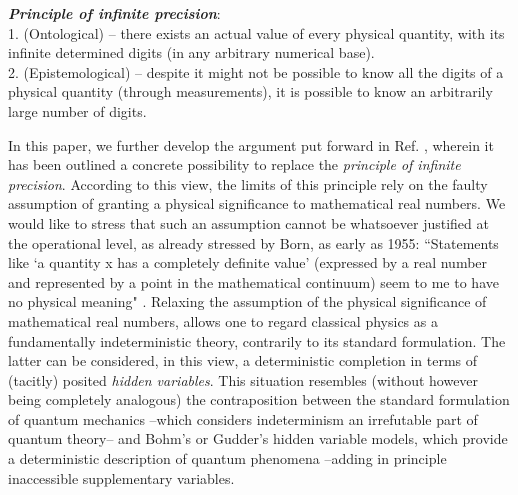 \documentclass[aps,prl,twocolumn,showpacs,superscriptaddress,groupedaddress, nofootinbib]{revtex4-1}
\begin{document}
\textbf{\emph{Principle of infinite precision}}:\\
1. (Ontological) -- there exists an actual value of every physical quantity, with its infinite determined digits (in any arbitrary numerical base).\\
2. (Epistemological) -- despite it might not be possible to know all the digits of a physical quantity (through measurements), it is possible to know an arbitrarily large number of digits. 

In this paper, we further develop the argument put forward in Ref. \cite{gisin1}, wherein it has been outlined a concrete possibility to replace the \emph{principle of infinite precision}. According to this view, the limits of this principle rely on the faulty assumption of granting a physical significance to mathematical real numbers. We would like to stress that such an assumption cannot be whatsoever justified at the operational level, as already stressed by Born, as early as 1955: ``Statements like `a quantity x has a completely definite value' (expressed by a real number and represented by a point in the mathematical continuum) seem to me to have no physical meaning" \cite{born}. Relaxing the assumption of the physical significance of mathematical real numbers, allows one to regard classical physics as a fundamentally indeterministic theory, contrarily to its standard formulation. The latter can be considered, in this view, a deterministic completion in terms of (tacitly) posited \emph{hidden variables}. This situation resembles (without however being completely analogous) the contraposition between the standard formulation of quantum mechanics --which considers indeterminism an irrefutable part of quantum theory-- and Bohm's \cite{bohm} or Gudder's \cite{gudder} hidden variable models, which provide a deterministic description of quantum phenomena --adding in principle inaccessible supplementary variables.
\end{document}
